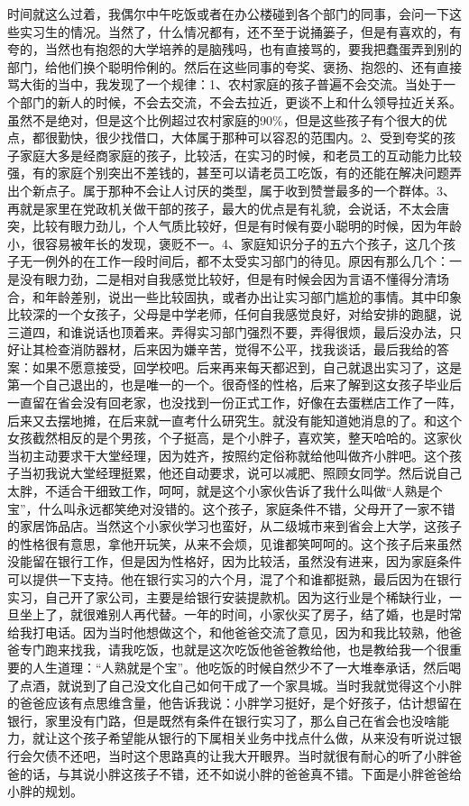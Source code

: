 时间就这么过着，我偶尔中午吃饭或者在办公楼碰到各个部门的同事，会问一下这些实习生的情况。当然了，什么情况都有，还不至于说捅篓子，但是有喜欢的，有夸的，当然也有抱怨的大学培养的是脑残吗，也有直接骂的，要我把蠢蛋弄到别的部门，给他们换个聪明伶俐的。然后在这些同事的夸奖、褒扬、抱怨的、还有直接骂大街的当中，我发现了一个规律：1、农村家庭的孩子普遍不会交流。当处于一个部门的新人的时候，不会去交流，不会去拉近，更谈不上和什么领导拉近关系。虽然不是绝对，但是这个比例超过农村家庭的90\%，但是这些孩子有个很大的优点，都很勤快，很少找借口，大体属于那种可以容忍的范围内。2、受到夸奖的孩子家庭大多是经商家庭的孩子，比较活，在实习的时候，和老员工的互动能力比较强，有的家庭个别突出不差钱的，甚至可以请老员工吃饭，有的还能在解决问题弄出个新点子。属于那种不会让人讨厌的类型，属于收到赞誉最多的一个群体。3、再就是家里在党政机关做干部的孩子，最大的优点是有礼貌，会说话，不太会唐突，比较有眼力劲儿，个人气质比较好，但是有时候有耍小聪明的时候，因为年龄小，很容易被年长的发现，褒贬不一。4、家庭知识分子的五六个孩子，这几个孩子无一例外的在工作一段时间后，都不太受实习部门的待见。原因有那么几个：一是没有眼力劲，二是相对自我感觉比较好，但是有时候会因为言语不懂得分清场合，和年龄差别，说出一些比较固执，或者办出让实习部门尴尬的事情。其中印象比较深的一个女孩子，父母是中学老师，任何自我感觉良好，对给安排的跑腿，说三道四，和谁说话也顶着来。弄得实习部门强烈不要，弄得很烦，最后没办法，只好让其检查消防器材，后来因为嫌辛苦，觉得不公平，找我谈话，最后我给的答案：如果不愿意接受，回学校吧。后来再来每天都迟到，自己就退出实习了，这是第一个自己退出的，也是唯一的一个。很奇怪的性格，后来了解到这女孩子毕业后一直留在省会没有回老家，也没找到一份正式工作，好像在去蛋糕店工作了一阵，后来又去摆地摊，在后来就一直考什么研究生。就没有能知道她消息的了。和这个女孩截然相反的是个男孩，个子挺高，是个小胖子，喜欢笑，整天哈哈的。这家伙当初主动要求干大堂经理，因为姓齐，按照约定俗称就给他叫做齐小胖吧。这个孩子当初我说大堂经理挺累，他还自动要求，说可以减肥、照顾女同学。然后说自己太胖，不适合干细致工作，呵呵，就是这个小家伙告诉了我什么叫做“人熟是个宝”，什么叫永远都笑绝对没错的。这个孩子，家庭条件不错，父母开了一家不错的家居饰品店。当然这个小家伙学习也蛮好，从二级城市来到省会上大学，这孩子的性格很有意思，拿他开玩笑，从来不会烦，见谁都笑呵呵的。这个孩子后来虽然没能留在银行工作，但是因为性格好，因为比较活，虽然没有进来，因为家庭条件可以提供一下支持。他在银行实习的六个月，混了个和谁都挺熟，最后因为在银行实习，自己开了家公司，主要是给银行安装提款机。因为这行业是个稀缺行业，一旦坐上了，就很难别人再代替。一年的时间，小家伙买了房子，结了婚，也是时常给我打电话。因为当时他想做这个，和他爸爸交流了意见，因为和我比较熟，他爸爸专门跑来找我，请我吃饭，也就是这次吃饭他爸爸教给他，也是教给我一个很重要的人生道理：“人熟就是个宝”。他吃饭的时候自然少不了一大堆奉承话，然后喝了点酒，就说到了自己没文化自己如何干成了一个家具城。当时我就觉得这个小胖的爸爸应该有点思维含量，他告诉我说：小胖学习挺好，是个好孩子，估计想留在银行，家里没有门路，但是既然有条件在银行实习了，那么自己在省会也没啥能力，就让这个孩子希望能从银行的下属相关业务中找点什么做，从来没有听说过银行会欠债不还吧，当时这个思路真的让我大开眼界。当时就很有耐心的听了小胖爸爸的话，与其说小胖这孩子不错，还不如说小胖的爸爸真不错。下面是小胖爸爸给小胖的规划。

